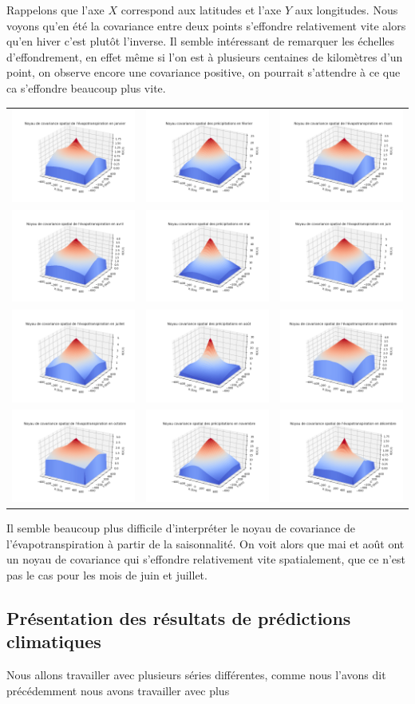 \documentclass[a4paper,10pt]{article}
\begin{document}
Rappelons que l'axe $X$ correspond aux latitudes et l'axe $Y$ aux longitudes. Nous voyons qu'en été la covariance entre deux points s'effondre relativement vite alors qu'en hiver c'est plutôt l'inverse.
Il semble intéressant de remarquer les échelles d'effondrement, en effet même si l'on est à plusieurs centaines de kilomètres d'un point, on observe encore une covariance positive, on pourrait s'attendre à ce que ca s'effondre beaucoup plus vite. 

\hspace{-3cm}
\begin{tabular}{ccc} 
	\includegraphics[scale=0.4]{images/kernel_evap_m1.png} & \includegraphics[scale=0.4]{images/kernel_precip_m2.png} & \includegraphics[scale=0.4]{images/kernel_evap_m3.png} \\ 
	\includegraphics[scale=0.4]{images/kernel_evap_m4.png} & \includegraphics[scale=0.4]{images/kernel_precip_m5.png} & \includegraphics[scale=0.4]{images/kernel_evap_m6.png} \\
	\includegraphics[scale=0.4]{images/kernel_evap_m7.png} & \includegraphics[scale=0.4]{images/kernel_precip_m8.png} & \includegraphics[scale=0.4]{images/kernel_evap_m9.png} \\ 
	\includegraphics[scale=0.4]{images/kernel_evap_m10.png} & \includegraphics[scale=0.4]{images/kernel_precip_m11.png} & \includegraphics[scale=0.4]{images/kernel_evap_m12.png} \\
\end{tabular} 

Il semble beaucoup plus difficile d'interpréter le noyau de covariance de l'évapotranspiration à partir de la saisonnalité. On voit alors que mai et août ont un noyau de covariance qui s'effondre relativement vite spatialement, que ce n'est pas le cas pour les mois de juin et juillet.

 
\newpage
\subsection{Présentation des résultats de prédictions climatiques}

Nous allons travailler avec plusieurs séries différentes, comme nous l'avons dit précédemment nous avons travailler avec plus
\end{document}
